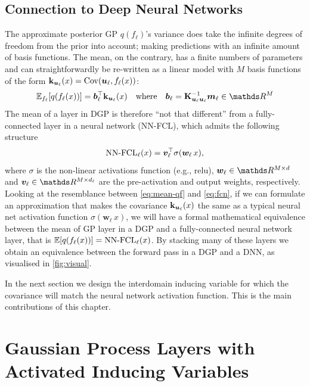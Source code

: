 \subsection{Connection to Deep Neural Networks}
The approximate posterior GP $q(f_\ell)$'s variance does take the infinite degrees of freedom from the prior into account; making predictions with an infinite amount of basis functions. The mean, on the contrary, has a finite numbers of parameters and can straightforwardly be re-written as a linear model with $M$ basis functions of the form $\mathbf{k}_{\bm{u}_\ell}(x) = \mathrm{Cov}(\bm{u}_\ell, f_\ell(x))$:
\begin{equation}
    \label{eq:mean-qf}
    \Exp{f_\ell}{q(f_\ell(x))} = \bm{b}_\ell^\top \kul(x) \quad \text{where} \quad \bm{b}_\ell = \Kulul^{-1} \vm_\ell \in \Reals^M
\end{equation}
The mean of a layer in DGP is therefore ``not that different'' from a fully-connected layer in a neural network (NN-FCL), which admits the following structure
\begin{equation}
    \label{eq:fcn}
    \text{NN-FCL}_\ell(x) = \bm{v}_\ell^{\top} \sigma(\bm{w}_\ell\,x),
\end{equation}
where $\sigma$ is the non-linear activations function (e.g., relu), $\bm{w}_\ell \in \Reals^{M \times d}$ and $\bm{v}_\ell \in \Reals^{M \times d_\ell}$ are the pre-activation and output weights, respectively. Looking at the resemblance between \cref{eq:mean-qf} and \cref{eq:fcn}, if we can formulate an approximation that makes the covariance $\mathbf{k}_{\bm{u}_\ell}(x)$ the same as a typical neural net activation function $\sigma(\bm{w}_\ell\,x)$, we will have a formal mathematical equivalence between the mean of GP layer in a DGP and a fully-connected neural network layer, that is $\mathbb{E}[q(f_\ell(x))] = \text{NN-FCL}_\ell(x)$. By stacking many of these layers we obtain an equivalence between the forward pass in a DGP and a DNN, as visualised in \cref{fig:visual}.

In the next section we design the interdomain inducing variable for which the covariance will match the neural network activation function. This is the main contributions of this chapter. 


\section{Gaussian Process Layers with Activated Inducing Variables}
\label{sec:dnn-for-dgps:model}

